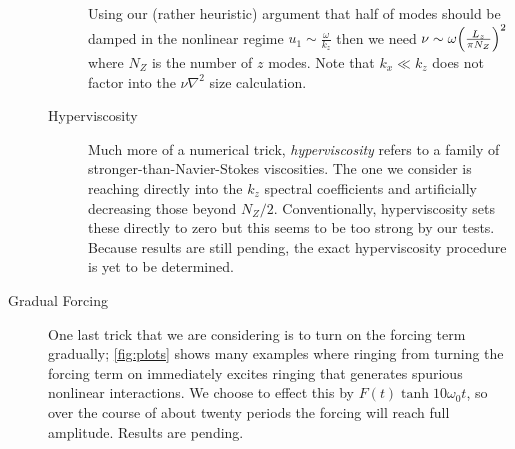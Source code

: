 \documentclass[11pt,
        usenames, %
        dvipsnames %
    ]{article}
\DeclarePairedDelimiter\p{\lparen}{\rparen}
\begin{document}
\begin{description}
\begin{description}
                Using our (rather heuristic) argument that half of modes should
                be damped in the nonlinear regime $u_1 \sim \frac{\omega}{k_z}$
                then we need $\nu \sim \omega \p*{\frac{L_z}{\pi N_Z}}^2$ where
                $N_Z$ is the number of $z$ modes. Note that $k_x\ll k_z$ does
                not factor into the $\nu \nabla^2$ size calculation.

            \item[Hyperviscosity] Much more of a numerical trick,
                \emph{hyperviscosity} refers to a family of
                stronger-than-Navier-Stokes viscosities. The one we consider is
                reaching directly into the $k_z$ spectral coefficients and
                artificially decreasing those beyond $N_Z/2$. Conventionally,
                hyperviscosity sets these directly to zero but this seems to be
                too strong by our tests. Because results are still pending, the
                exact hyperviscosity procedure is yet to be determined.
        \end{description}

    \item[Gradual Forcing] One last trick that we are considering is to turn on
        the forcing term gradually; \autoref{fig:plots} shows many examples
        where ringing from turning the forcing term on immediately excites
        ringing that generates spurious nonlinear interactions. We choose to
        effect this by $F(t) \tanh 10\omega_0t$, so over the course of about
        twenty periods the forcing will reach full amplitude. Results are
        pending.
\end{description}
\end{document}

